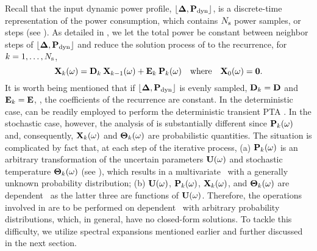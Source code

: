 Recall that the input dynamic power profile, $\profPdyn$, is a discrete-time representation of the power consumption, which contains $N_\text{s}$ power samples, or steps (see ). As detailed in , we let the total power be constant between neighbor steps of $\profPdyn$ and reduce the solution process of  to the recurrence, for $k = 1, \dotsc, N_\text{s}$,
\begin{equation} \elabel{recurrence}
  \vX_k(\o) = \mCF_k \: \vX_{k - 1}(\o) + \mCS_k \: \vP_k(\o) \hspace{1em} \text{where} \hspace{1em} \vX_0(\o) = \vZero.
\end{equation}
It is worth being mentioned that if $\profPdyn$ is evenly sampled, $\mCF_k = \mCF$ and $\mCS_k = \mCS$, \ie, the coefficients of the recurrence are constant. In the deterministic case,  can be readily employed to perform the deterministic transient PTA \cite{thiele2011, ukhov2012}. In the stochastic case, however, the analysis of  is substantially different since $\mathbf{P}_k(\omega)$ and, consequently, $\mathbf{X}_k(\omega)$ and ${\boldsymbol\Theta}_k(\omega)$ are probabilistic quantities. The situation is complicated by fact that, at each step of the iterative process, (a) $\mathbf{P}_k(\omega)$ is an arbitrary transformation of the uncertain parameters $\mathbf{U}(\omega)$ and stochastic temperature ${\boldsymbol\Theta}_k(\omega)$ (see ), which results in a multivariate \rv\ with a generally unknown probability distribution; (b) $\mathbf{U}(\omega)$, $\mathbf{P}_k(\omega)$, $\mathbf{X}_k(\omega)$, and ${\boldsymbol\Theta}_k(\omega)$ are dependent \rvs\ as the latter three are functions of $\mathbf{U}(\omega)$. Therefore, the operations involved in  are to be performed on dependent \rvs\ with arbitrary probability distributions, which, in general, have no closed-form solutions. To tackle this difficulty, we utilize spectral expansions mentioned earlier and further discussed in the next section.
